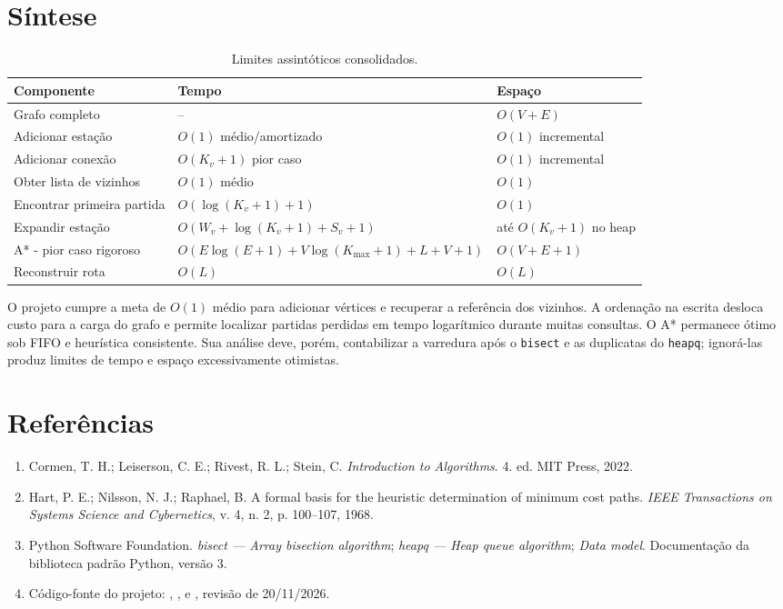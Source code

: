 \documentclass[11pt,a4paper]{article}
\begin{document}
\section{Síntese}

\begin{table}[ht]
\centering
\caption{Limites assintóticos consolidados.}
\begin{tabularx}{\textwidth}{@{}lXX@{}}
\toprule
Componente & Tempo & Espaço \\
\midrule
Grafo completo & -- & $O(V+E)$ \\
Adicionar estação & $O(1)$ médio/amortizado & $O(1)$ incremental \\
Adicionar conexão & $O(K_v+1)$ pior caso & $O(1)$ incremental \\
Obter lista de vizinhos & $O(1)$ médio & $O(1)$ \\
Encontrar primeira partida & $O(\log(K_v+1)+1)$ & $O(1)$ \\
Expandir estação & $O(W_v+\log(K_v+1)+S_v+1)$ & até $O(K_v+1)$ no heap \\
A* - pior caso rigoroso & $O(E\log(E+1)+V\log(K_{\max}+1)+L+V+1)$ & $O(V+E+1)$ \\
Reconstruir rota & $O(L)$ & $O(L)$ \\
\bottomrule
\end{tabularx}
\end{table}

O projeto cumpre a meta de $O(1)$ médio para adicionar vértices e recuperar a
referência dos vizinhos. A ordenação na escrita desloca custo para a carga do
grafo e permite localizar partidas perdidas em tempo logarítmico durante muitas
consultas. O A* permanece ótimo sob FIFO e heurística consistente. Sua análise
deve, porém, contabilizar a varredura após o \texttt{bisect} e as duplicatas do
\texttt{heapq}; ignorá-las produz limites de tempo e espaço excessivamente
otimistas.

\section*{Referências}

\begin{enumerate}
  \item Cormen, T. H.; Leiserson, C. E.; Rivest, R. L.; Stein, C.
  \textit{Introduction to Algorithms}. 4. ed. MIT Press, 2022.
  \item Hart, P. E.; Nilsson, N. J.; Raphael, B. A formal basis for the
  heuristic determination of minimum cost paths. \textit{IEEE Transactions on
  Systems Science and Cybernetics}, v. 4, n. 2, p. 100--107, 1968.
  \item Python Software Foundation. \textit{bisect --- Array bisection
  algorithm}; \textit{heapq --- Heap queue algorithm}; \textit{Data model}.
  Documentação da biblioteca padrão Python, versão 3.
  \item Código-fonte do projeto: ,
  ,  e
  , revisão de 20/11/2026.
\end{enumerate}
\end{document}
